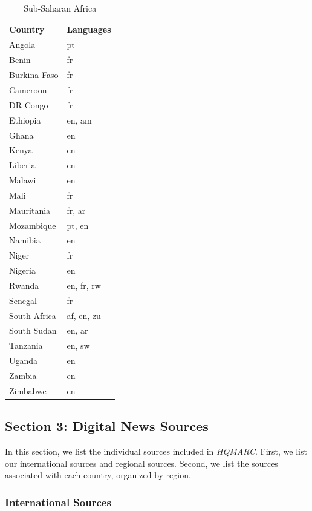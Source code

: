 \documentclass[
  letterpaper,
  DIV=11,
  numbers=noendperiod]{scrartcl}
\begin{document}
\begin{table}[!h]
\centering
\caption{Sub-Saharan Africa}
\centering
\fontsize{10}{12}\selectfont
\begin{tabular}[t]{l|l}
\hline
Country & Languages\\
\hline
Angola & pt\\
Benin & fr\\
Burkina Faso & fr\\
Cameroon & fr\\
DR Congo & fr\\
Ethiopia & en, am\\
Ghana & en\\
Kenya & en\\
Liberia & en\\
Malawi & en\\
Mali & fr\\
Mauritania & fr, ar\\
Mozambique & pt, en\\
Namibia & en\\
Niger & fr\\
Nigeria & en\\
Rwanda & en, fr, rw\\
Senegal & fr\\
South Africa & af, en, zu\\
South Sudan & en, ar\\
Tanzania & en, sw\\
Uganda & en\\
Zambia & en\\
Zimbabwe & en\\
\hline
\end{tabular}
\end{table}

\clearpage

\subsection{Section 3: Digital News
Sources}\label{section-3-digital-news-sources}

In this section, we list the individual sources included in
\emph{HQMARC}. First, we list our international sources and regional
sources. Second, we list the sources associated with each country,
organized by region.

\subsubsection{International Sources}\label{international-sources}
\end{document}
